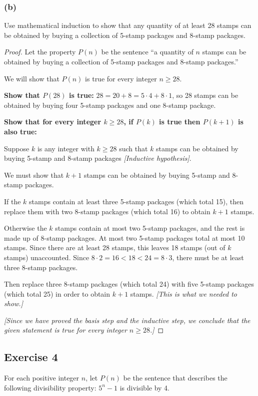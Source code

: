\documentclass[14pt]{extarticle}
\begin{document}
\subsubsection{(b)}
Use mathematical induction to show that any quantity of at least 28 stamps can be obtained by buying a collection of 5-stamp packages and 8-stamp packages.

\begin{proof}
Let the property $P(n)$ be the sentence “a quantity of $n$ stamps can be obtained by buying a collection of 5-stamp packages and 8-stamp packages.” 

We will show that $P(n)$ is true for every integer $n \geq 28$. 

{\bf Show that $P(28)$ is true:} $28 = 20 + 8 = 5 \cdot 4 + 8 \cdot 1$, so 28 stamps can be obtained by buying four 5-stamp packages and one 8-stamp package. 

{\bf Show that for every integer $k \geq 28$, if $P(k)$ is true then $P(k + 1)$ is also true:} 

Suppose $k$ is any integer with $k \geq 28$ such that $k$ stamps can be obtained by buying 5-stamp and 8-stamp packages {\it [Inductive hypothesis]}. 

We must show that $k + 1$ stamps can be obtained by buying 5-stamp and 8-stamp packages. 

If the $k$ stamps contain at least three 5-stamp packages (which total 15), then replace them with two 8-stamp packages (which total 16) to obtain $k+1$ stamps.

Otherwise the $k$ stamps contain at most two 5-stamp packages, and the rest is made up of 8-stamp packages. At most two 5-stamp packages total at most 10 stamps. Since there are at least 28 stamps, this leaves 18 stamps (out of $k$ stamps) unaccounted. Since $8 \cdot 2  = 16 < 18 < 24 = 8 \cdot 3$, there must be at least three 8-stamp packages.

Then replace three 8-stamp packages (which total 24) with five 5-stamp packages (which total 25) in order to obtain $k+1$ stamps. {\it [This is what we needed to show.]}

{\it [Since we have proved the basis step and the inductive step, we conclude that the given statement is true for every integer $n \geq 28$.]}
\end{proof}

\subsection{Exercise 4}
For each positive integer $n$, let $P(n)$ be the sentence that describes the following divisibility property: $5^n - 1$ is divisible by 4.
\end{document}
